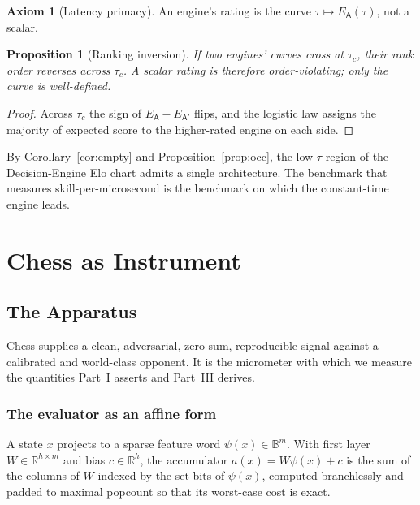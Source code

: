 \documentclass[11pt,oneside]{book}
\theoremstyle{definition}
\newtheorem{axiom}{Axiom}[chapter]
\theoremstyle{plain}
\newtheorem{proposition}{Proposition}[chapter]
\theoremstyle{remark}
\newcommand{\Bits}{\mathbb{B}}
\newcommand{\Word}[1]{\Bits^{#1}}
\newcommand{\Elo}{E}
\newcommand{\Engine}{\mathsf{A}}
\newcommand{\budget}{\tau}
\newcommand{\Reals}{\mathbb{R}}
\begin{document}
\begin{axiom}[Latency primacy]\label{ax:primacy}
An engine's rating is the curve $\budget\mapsto\Elo_\Engine(\budget)$, not a scalar.
\end{axiom}

\begin{proposition}[Ranking inversion]\label{prop:rankinv}
If two engines' curves cross at $\budget_c$, their rank order reverses across $\budget_c$.
A scalar rating is therefore order-violating; only the curve is well-defined.
\end{proposition}
\begin{proof}
Across $\budget_c$ the sign of $\Elo_\Engine-\Elo_{\Engine'}$ flips, and the logistic law
assigns the majority of expected score to the higher-rated engine on each side.
\end{proof}

By Corollary~\ref{cor:empty} and Proposition~\ref{prop:occ}, the low-$\budget$ region of
the Decision-Engine Elo chart admits a single architecture. The benchmark that measures
skill-per-microsecond is the benchmark on which the constant-time engine leads.

\part{Chess as Instrument}

\chapter{The Apparatus}\label{ch:engine}

Chess supplies a clean, adversarial, zero-sum, reproducible signal against a calibrated
and world-class opponent. It is the micrometer with which we measure the quantities Part~I
asserts and Part~III derives.

\section{The evaluator as an affine form}
A state $x$ projects to a sparse feature word $\psi(x)\in\Word{m}$. With first layer
$W\in\Reals^{h\times m}$ and bias $c\in\Reals^h$, the accumulator $a(x)=W\psi(x)+c$ is the
sum of the columns of $W$ indexed by the set bits of $\psi(x)$, computed branchlessly and
padded to maximal popcount so that its worst-case cost is exact.
\end{document}

